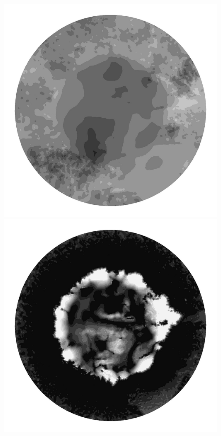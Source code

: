 \begin{figure}
  \begin{minipage}[b]{0.30\linewidth}
    \includegraphics[width=1.0\textwidth]{images/EISMINT_II/U/S_2000.jpg}
  \end{minipage}
  \quad
  \begin{minipage}[b]{0.30\linewidth}
    \includegraphics[width=1.0\textwidth]{images/EISMINT_II/U/beta_2000.jpg}

\end{minipage}
\end{figure}
